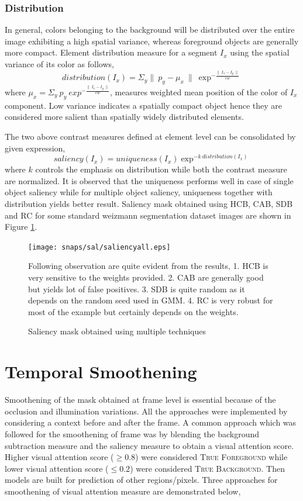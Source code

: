 \subsubsection{Distribution}
In general, colors belonging to the background will be distributed over the entire image exhibiting a high spatial variance, whereas foreground objects are generally more compact. Element distribution measure for a segment $I_{x}$ using the spatial variance of its color as follows,
$$distribution(I_{x}) = \Sigma_{y} \parallel~p_{y} -\mu_{x}~\parallel~\exp^{-\frac{\parallel~I_{x} - I_{y}~\parallel}{cw}}$$ 
where $\mu_{x} = \Sigma_{y}~p_{y}~exp^{-\frac{\parallel~I_{x} - I_{y}~\parallel}{cw}}$, measures weighted mean position of the color of $I_{x}$ component. Low variance indicates a spatially compact object hence they are considered more salient than spatially widely distributed elements.

\par The two above contrast measures defined at element level can be consolidated by given expression,
$$saliency(I_{x}) = uniqueness(I_{x}) \exp^{-k~distribution(I_{x})}$$
where $k$ controls the emphasis on distribution while both the contrast measure are normalized. It is observed that the uniqueness performs well in case of single object saliency while for multiple object saliency, uniqueness together with distribution yields better result. Saliency mask obtained using HCB, CAB, SDB and RC for some standard weizmann segmentation dataset images are shown in Figure \ref{fig:sal}. 

\begin{figure}[htpb]
   \begin{center}
	    \texttt{[image: snaps/sal/saliencyall.eps]}     
     \caption {Saliency mask obtained using multiple techniques}
     \medskip \small 
     Following observation are quite evident from the results, 1. HCB is very sensitive to the weights provided. 2. CAB are generally good but yields lot of false positives. 3. SDB is quite random as it depends on the random seed used in GMM. 4. RC is very robust for most of the example but certainly depends on the weights.
   \label{fig:sal}
   \end{center}
 \end{figure}

 \section{Temporal Smoothening}
  \label{sec:ts}
Smoothening of the mask obtained at frame level is essential because of the occlusion and illumination variations. All the approaches were implemented by considering a context before and after the frame. A common approach which was followed for the smoothening of frame was by blending the background subtraction measure and the saliency measure to obtain a visual attention score. Higher visual attention score ($\geqslant0.8$) were considered \textsc{True Foreground} while lower visual attention score ($\leqslant0.2$)  were considered \textsc{True Background}. Then models are built for prediction of other regions/pixels. Three approaches for smoothening of visual attention measure are demonstrated below,

